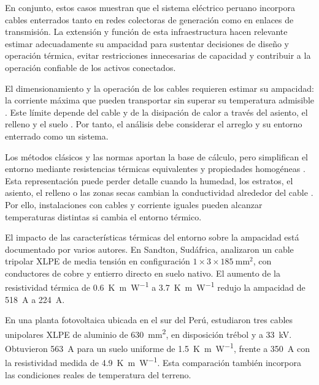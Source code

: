 \documentclass[11pt,a4paper,oneside]{report}
\begin{document}
En conjunto, estos casos muestran que el sistema eléctrico peruano incorpora cables enterrados tanto en redes colectoras de generación como en enlaces de transmisión. La extensión y función de esta infraestructura hacen relevante estimar adecuadamente su ampacidad para sustentar decisiones de diseño y operación térmica, evitar restricciones innecesarias de capacidad y contribuir a la operación confiable de los activos conectados.

El dimensionamiento y la operación de los cables requieren estimar su ampacidad: la corriente máxima que pueden transportar sin superar su temperatura admisible \parencite{iec60287}. Este límite depende del cable y de la disipación de calor a través del asiento, el relleno y el suelo \parencites{fariz2026}{mobius2025}. Por tanto, el análisis debe considerar el arreglo y su entorno enterrado como un sistema.

Los métodos clásicos y las normas aportan la base de cálculo, pero simplifican el entorno mediante resistencias térmicas equivalentes y propiedades homogéneas \parencites[752--760]{neher1957}{iec60287}{iec60853}. Esta representación puede perder detalle cuando la humedad, los estratos, el asiento, el relleno o las zonas secas cambian la conductividad alrededor del cable \parencites[4--6]{enescu2021}[1--3]{aldulaimi2024}. Por ello, instalaciones con cables y corriente iguales pueden alcanzar temperaturas distintas si cambia el entorno térmico.

El impacto de las características térmicas del entorno sobre la ampacidad está documentado por varios autores. En Sandton, Sudáfrica, \textcite[5--6, tabs.~2--3]{khumalo2025} analizaron un cable tripolar XLPE de media tensión en configuración $1\times3\times\SI{185}{\milli\metre\squared}$, con conductores de cobre y entierro directo en suelo nativo. El aumento de la resistividad térmica de \SI{0.6}{\kelvin\metre\per\watt} a \SI{3.7}{\kelvin\metre\per\watt} redujo la ampacidad de \SI{518}{\ampere} a \SI{224}{\ampere}.

En una planta fotovoltaica ubicada en el sur del Perú, \textcite[7--8]{ariasVelasquez2023} estudiaron tres cables unipolares XLPE de aluminio de \SI{630}{\milli\metre\squared}, en disposición trébol y a \SI{33}{\kilo\volt}. Obtuvieron \SI{563}{\ampere} para un suelo uniforme de \SI{1.5}{\kelvin\metre\per\watt}, frente a \SI{350}{\ampere} con la resistividad medida de \SI{4.9}{\kelvin\metre\per\watt}. Esta comparación también incorpora las condiciones reales de temperatura del terreno.
\end{document}
